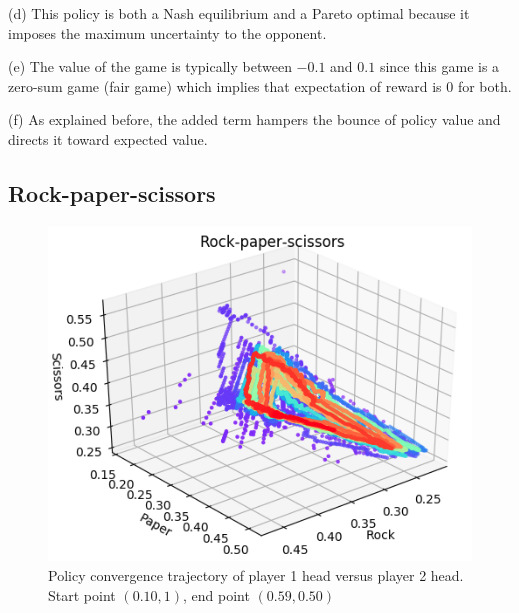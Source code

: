 \documentclass[journal]{IEEEtran}
\begin{document}
(d) This policy is both a Nash equilibrium and a Pareto optimal because it imposes the maximum uncertainty to the opponent.

(e) The value of the game is typically between $-0.1$ and $0.1$ since this game is a zero-sum game (fair game) which implies that expectation of reward is 0 for both.

(f) As explained before, the added term hampers the bounce of policy value and directs it toward expected value.

\subsection{Rock-paper-scissors}


\begin{figure}[!t]
\centering
\includegraphics[scale=0.37]{figure/thirdGameSecondPolicy1m.png}
\caption{Policy convergence trajectory of player 1 head versus player 2 head. Start point $(0.10, 1)$, end point $(0.59, 0.50)$}
\label{Fig:thirdPolSecondGame11}
\end{figure}
\end{document}
